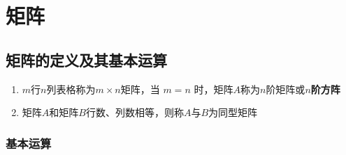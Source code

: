 \documentclass[./linear_algebra.tex]{subfiles}
\begin{document}
    \section{矩阵}

    \subsection{矩阵的定义及其基本运算}

    \begin{enumerate}
        \item $m$行$n$列表格称为$m \times n$矩阵，当 $m = n$ 时，矩阵$A$称为$n$阶矩阵或\textbf{$n$阶方阵}
        \item 矩阵$A$和矩阵$B$行数、列数相等，则称$A$与$B$为同型矩阵
    \end{enumerate}

    \subsubsection{基本运算}
\end{document}
